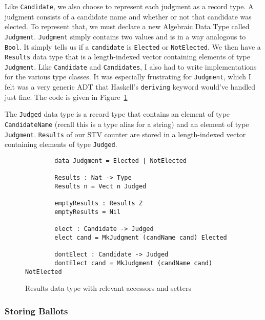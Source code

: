 Like \texttt{Candidate}, we also choose to represent each judgment as a record
type. A judgment consists of a candidate name and whether or not that candidate
was elected. To represent that, we must declare a new Algebraic Data Type called
\texttt{Judgment}. \texttt{Judgment} simply contains two values and is in a way
analogous to \texttt{Bool}. It simply tells us if a \texttt{candidate} is
\texttt{Elected} or \texttt{NotElected}. We then have a \texttt{Results} data
type that is a length-indexed vector containing elements of type
\texttt{Judgment}. Like \texttt{Candidate} and \texttt{Candidates}, I also had
to write implementations for the various type classes. It was especially
frustrating for \texttt{Judgment}, which I felt was a very generic ADT that
Haskell's \texttt{deriving} keyword would've handled just fine. The code is
given in Figure~\ref{judgments_code}

The \texttt{Judged} data type is a record type that contains an element of type
\texttt{CandidateName} (recall this is a type alias for a string) and an element
of type \texttt{Judgment}. \texttt{Results} of our STV counter are stored in a
length-indexed vector containing elements of type \texttt{Judged}.

\begin{figure}[htbp!!!!!!!!!!!!!!]
	\caption{Results data type with relevant accessors and setters}
	\label{judgments_code}
	\begin{lstlisting}
        data Judgment = Elected | NotElected

        Results : Nat -> Type
        Results n = Vect n Judged
        
        emptyResults : Results Z
        emptyResults = Nil

        elect : Candidate -> Judged
        elect cand = MkJudgment (candName cand) Elected

        dontElect : Candidate -> Judged
        dontElect cand = MkJudgment (candName cand) NotElected
    \end{lstlisting}
\end{figure}

\subsubsection{Storing Ballots}


